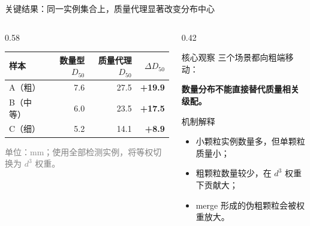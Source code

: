 \documentclass[UTF8,aspectratio=169,11pt]{ctexbeamer}
\newcommand{\smallgray}[1]{{\scriptsize\textcolor{gray}{#1}}}
\begin{document}
\begin{frame}{关键结果：同一实例集合上，质量代理显著改变分布中心}
\begin{columns}[T]
\begin{column}{0.58\textwidth}
\centering
{\small
\renewcommand{\arraystretch}{1.25}
\begin{tabular}{lrrr}
\toprule
样本 & 数量型 $D_{50}$ & 质量代理 $D_{50}$ & $\Delta D_{50}$ \\
\midrule
A（粗） & 7.6 & 27.5 & \textbf{+19.9} \\
B（中等） & 6.0 & 23.5 & \textbf{+17.5} \\
C（细） & 5.2 & 14.1 & \textbf{+8.9} \\
\bottomrule
\end{tabular}}
\vspace{0.55em}

\smallgray{单位：mm；使用全部检测实例，将等权切换为 $d^3$ 权重。}
\end{column}
\begin{column}{0.42\textwidth}
\begin{alertblock}{核心观察}
\small 三个场景都向粗端移动：

\textbf{数量分布不能直接替代质量相关级配。}
\end{alertblock}
\vspace{0.25em}
\begin{block}{机制解释}
\footnotesize
\begin{itemize}
  \item 小颗粒实例数量多，但单颗粒质量小；
  \item 粗颗粒数量较少，在 $d^3$ 权重下贡献大；
  \item merge 形成的伪粗颗粒会被权重放大。
\end{itemize}
\end{block}
\end{column}
\end{columns}
\end{frame}
\end{document}
